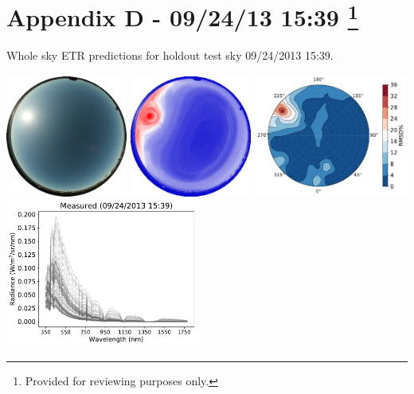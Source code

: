 \section*{Appendix D - 09/24/13 15:39 \footnote{Provided for reviewing purposes only.}}

\noindent
Whole sky ETR predictions for holdout test sky {09/24/2013 15:39}.\\%

\begin{center}
\includegraphics[width=0.30\textwidth]{img/09241539.jpg}
\includegraphics[width=0.30\textwidth]{img/09241539_sradmap.png}
\includegraphics[width=0.38\textwidth]{img/09241539_wholesky_full.pdf}\\
\vspace{0.26in}%
\includegraphics[width=0.48\textwidth]{img/09241539_measured.pdf}

\end{center}
